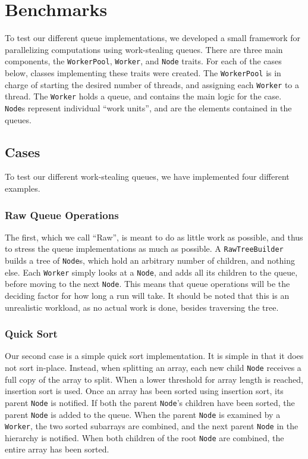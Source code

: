 \section{Benchmarks}
To test our different queue implementations, we developed a small framework
for parallelizing computations using work-stealing queues. There are three
main components, the \texttt{WorkerPool}, \texttt{Worker}, and \texttt{Node}
traits. For each of the cases below, classes implementing these traits were
created. The \texttt{WorkerPool} is in charge of starting the desired number
of threads, and assigning each \texttt{Worker} to a thread. The \texttt{Worker}
holds a queue, and contains the main logic for the case. \texttt{Node}s
represent individual ``work units'', and are the elements contained in the
queues.

\label{sec:benchmarks}
\subsection{Cases}
To test our different work-stealing queues, we have implemented four different
examples.
\subsubsection{Raw Queue Operations} %

The first, which we call ``Raw'', is meant to do as little work as possible,
and thus to stress the queue implementations as much as possible. A
\texttt{RawTreeBuilder} builds a tree of \texttt{Node}s, which hold an
arbitrary number of children, and nothing else. Each \texttt{Worker} simply
looks at a \texttt{Node}, and adds all its children to the queue, before
moving to the next \texttt{Node}. This means that queue operations will be the
deciding factor for how long a run will take. It should be noted that this is
an unrealistic workload, as no actual work is done, besides traversing the
tree.

\subsubsection{Quick Sort} %
Our second case is a simple quick sort implementation. It is simple in that it
does not sort in-place. Instead, when splitting an array, each new child
\texttt{Node} receives a full copy of the array to split. When a lower
threshold for array length is reached, insertion sort is used. Once an array
has been sorted using insertion sort, its parent \texttt{Node} is notified. If
both the parent \texttt{Node}'s children have been sorted, the parent
\texttt{Node} is added to the queue. When the parent \texttt{Node} is examined
by a \texttt{Worker}, the two sorted subarrays are combined, and the next
parent \texttt{Node} in the hierarchy is notified. When both children of the
root \texttt{Node} are combined, the entire array has been sorted. 

